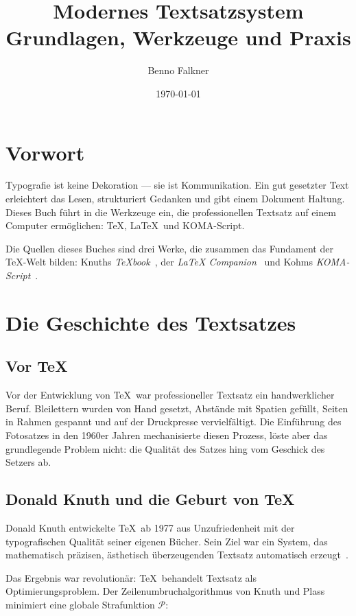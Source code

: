 \documentclass[
]{bfbook}
\title{Modernes Textsatzsystem\\Grundlagen, Werkzeuge und Praxis}
\author{Benno Falkner}
\date{\today}
\begin{document}
\frontmatter
\maketitle
\tableofcontents

\chapter{Vorwort}

Typografie ist keine Dekoration — sie ist Kommunikation. Ein gut gesetzter
Text erleichtert das Lesen, strukturiert Gedanken und gibt einem Dokument
Haltung. Dieses Buch führt in die Werkzeuge ein, die professionellen
Textsatz auf einem Computer ermöglichen: \TeX, \LaTeX\ und KOMA-Script.

Die Quellen dieses Buches sind drei Werke, die zusammen das Fundament
der \TeX-Welt bilden: Knuths \emph{TeXbook}~\cite{knuth1984texbook},
der \emph{LaTeX Companion}~\cite{mittelbach2004latex} und Kohms
\emph{KOMA-Script}~\cite{kohm2021komascript}.

\mainmatter

\chapter{Die Geschichte des Textsatzes}

\section{Vor \TeX}

Vor der Entwicklung von \TeX\ war professioneller Textsatz ein handwerklicher
Beruf. Bleilettern wurden von Hand gesetzt, Abstände mit Spatien gefüllt,
Seiten in Rahmen gespannt und auf der Druckpresse vervielfältigt. Die
Einführung des Fotosatzes in den 1960er Jahren mechanisierte diesen Prozess,
löste aber das grundlegende Problem nicht: die Qualität des Satzes hing
vom Geschick des Setzers ab.

\section{Donald Knuth und die Geburt von \TeX}

Donald Knuth entwickelte \TeX\ ab 1977 aus Unzufriedenheit mit der
typografischen Qualität seiner eigenen Bücher. Sein Ziel war ein System,
das mathematisch präzisen, ästhetisch überzeugenden Textsatz automatisch
erzeugt~\cite{knuth1984texbook}.

Das Ergebnis war revolutionär: \TeX\ behandelt Textsatz als
Optimierungsproblem. Der Zeilenumbruchalgorithmus von Knuth und Plass
minimiert eine globale Strafunktion $\mathcal{P}$:
\end{document}
